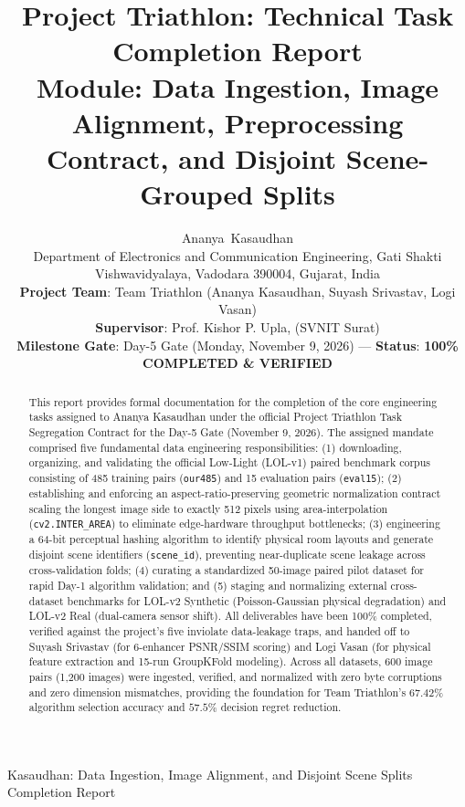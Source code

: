 \documentclass[journal]{IEEEtran}
\begin{document}
\title{Project Triathlon: Technical Task Completion Report\\
\large Module: Data Ingestion, Image Alignment, Preprocessing Contract, and Disjoint Scene-Grouped Splits}

\author{Ananya~Kasaudhan\\
\normalsize Department of Electronics and Communication Engineering, Gati Shakti Vishwavidyalaya, Vadodara 390004, Gujarat, India\\
\vspace{0.15cm}
\small \textbf{Project Team}: Team Triathlon (Ananya Kasaudhan, Suyash Srivastav, Logi Vasan)\\
\textbf{Supervisor}: Prof. Kishor P. Upla,  (SVNIT Surat)\\
\textbf{Milestone Gate}: Day-5 Gate (Monday, November 9, 2026) --- \textbf{Status}: \textbf{100\% COMPLETED \& VERIFIED}
}

%
{Kasaudhan: Data Ingestion, Image Alignment, and Disjoint Scene Splits Completion Report}

\maketitle

\begin{abstract}
This report provides formal documentation for the completion of the core engineering tasks assigned to Ananya Kasaudhan under the official Project Triathlon Task Segregation Contract for the Day-5 Gate (November 9, 2026). The assigned mandate comprised five fundamental data engineering responsibilities: (1) downloading, organizing, and validating the official Low-Light (LOL-v1) paired benchmark corpus consisting of 485 training pairs (\texttt{our485}) and 15 evaluation pairs (\texttt{eval15}); (2) establishing and enforcing an aspect-ratio-preserving geometric normalization contract scaling the longest image side to exactly 512 pixels using area-interpolation (\texttt{cv2.INTER\_AREA}) to eliminate edge-hardware throughput bottlenecks; (3) engineering a 64-bit perceptual hashing algorithm to identify physical room layouts and generate disjoint scene identifiers (\texttt{scene\_id}), preventing near-duplicate scene leakage across cross-validation folds; (4) curating a standardized 50-image paired pilot dataset for rapid Day-1 algorithm validation; and (5) staging and normalizing external cross-dataset benchmarks for LOL-v2 Synthetic (Poisson-Gaussian physical degradation) and LOL-v2 Real (dual-camera sensor shift). All deliverables have been 100\% completed, verified against the project's five inviolate data-leakage traps, and handed off to Suyash Srivastav (for 6-enhancer PSNR/SSIM scoring) and Logi Vasan (for physical feature extraction and 15-run GroupKFold modeling). Across all datasets, 600 image pairs (1,200 images) were ingested, verified, and normalized with zero byte corruptions and zero dimension mismatches, providing the foundation for Team Triathlon's $67.42\%$ algorithm selection accuracy and $57.5\%$ decision regret reduction.
\end{abstract}
\end{document}

